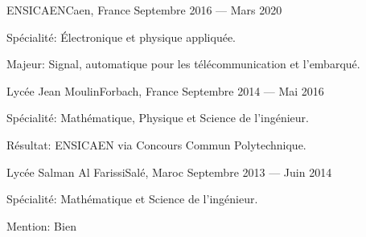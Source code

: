 
    {ENSICAEN}{Caen, France}
    {Septembre 2016 --- Mars 2020}
    {%
        \begin{additems}
            \item Spécialité: Électronique et physique appliquée.
            \item Majeur: Signal, automatique pour les télécommunication et l'embarqué.
        \end{additems}
    }

    {Lycée Jean Moulin}{Forbach, France}
    {Septembre 2014 --- Mai 2016}
    {%
        \begin{additems}
            \item Spécialité: Mathématique, Physique et Science de l'ingénieur.
            \item Résultat: ENSICAEN via Concours Commun Polytechnique.
        \end{additems}
    }

    {Lycée Salman Al Farissi}{Salé, Maroc}
    {Septembre 2013 --- Juin 2014}
    {%
        \begin{additems}
            \item Spécialité: Mathématique et Science de l'ingénieur.
            \item Mention: Bien
        \end{additems}
    }
